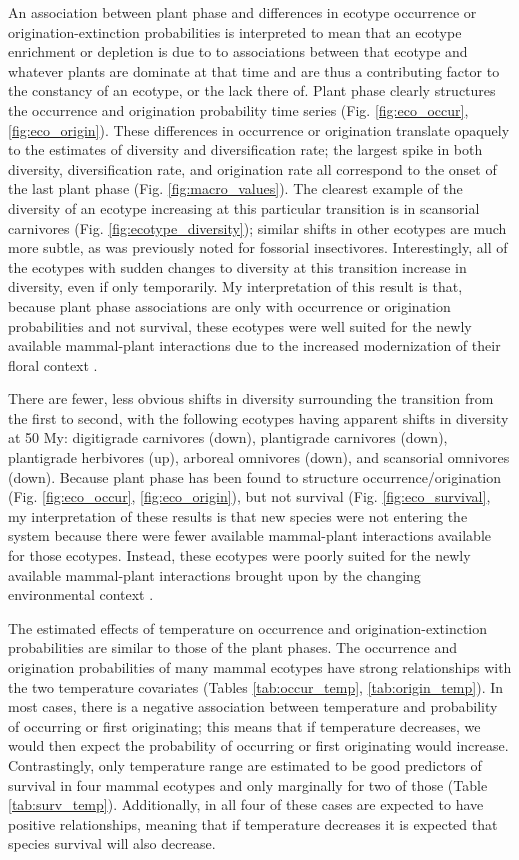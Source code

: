 \documentclass[12pt,letterpaper]{article}
\begin{document}
An association between plant phase and differences in ecotype occurrence or origination-extinction probabilities is interpreted to mean that an ecotype enrichment or depletion is due to to associations between that ecotype and whatever plants are dominate at that time and are thus a contributing factor to the constancy of an ecotype, or the lack there of. Plant phase clearly structures the occurrence and origination probability time series (Fig. \ref{fig:eco_occur}, \ref{fig:eco_origin}). These differences in occurrence or origination translate opaquely to the estimates of diversity and diversification rate; the largest spike in both diversity, diversification rate, and origination rate all correspond to the onset of the last plant phase (Fig. \ref{fig:macro_values}). The clearest example of the diversity of an ecotype increasing at this particular transition is in scansorial carnivores (Fig. \ref{fig:ecotype_diversity}); similar shifts in other ecotypes are much more subtle, as was previously noted for fossorial insectivores. Interestingly, all of the ecotypes with sudden changes to diversity at this transition increase in diversity, even if only temporarily. My interpretation of this result is that, because plant phase associations are only with occurrence or origination probabilities and not survival, these ecotypes were well suited for the newly available mammal-plant interactions due to the increased modernization of their floral context \citep{Graham2011a}.

There are fewer, less obvious shifts in diversity surrounding the transition from the first to second, with the following ecotypes having apparent shifts in diversity at 50 My: digitigrade carnivores (down), plantigrade carnivores (down), plantigrade herbivores (up), arboreal omnivores (down), and scansorial omnivores (down). Because plant phase has been found to structure occurrence/origination (Fig. \ref{fig:eco_occur}, \ref{fig:eco_origin}), but not survival (Fig. \ref{fig:eco_survival}, my interpretation of these results is that new species were not entering the system because there were fewer available mammal-plant interactions available for those ecotypes. Instead, these ecotypes were poorly suited for the newly available mammal-plant interactions brought upon by the changing environmental context \citep{Graham2011a}.

The estimated effects of temperature on occurrence and origination-extinction probabilities are similar to those of the plant phases. The occurrence and origination probabilities of many mammal ecotypes have strong relationships with the two temperature covariates (Tables \ref{tab:occur_temp}, \ref{tab:origin_temp}). In most cases, there is a negative association between temperature and probability of occurring or first originating; this means that if temperature decreases, we would then expect the probability of occurring or first originating would increase. Contrastingly, only temperature range are estimated to be good predictors of survival in four mammal ecotypes and only marginally for two of those (Table \ref{tab:surv_temp}). Additionally, in all four of these cases are expected to have positive relationships, meaning that if temperature decreases it is expected that species survival will also decrease.
\end{document}
